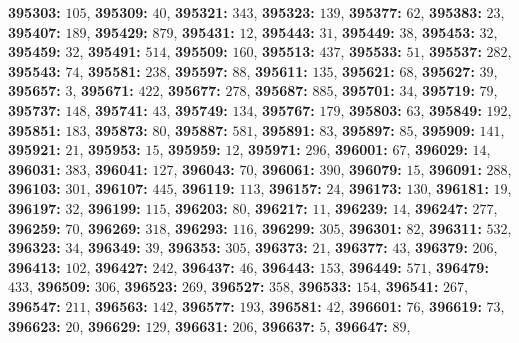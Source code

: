 \textsf{\bfseries 395303:} $105$, \textsf{\bfseries 395309:} $40$, \textsf{\bfseries 395321:} $343$, \textsf{\bfseries 395323:} $139$, \textsf{\bfseries 395377:} $62$, \textsf{\bfseries 395383:} $23$, \textsf{\bfseries 395407:} $189$, \textsf{\bfseries 395429:} $879$, \textsf{\bfseries 395431:} $12$, \textsf{\bfseries 395443:} $31$, \textsf{\bfseries 395449:} $38$, \textsf{\bfseries 395453:} $32$, \textsf{\bfseries 395459:} $32$, \textsf{\bfseries 395491:} $514$, \textsf{\bfseries 395509:} $160$, \textsf{\bfseries 395513:} $437$, \textsf{\bfseries 395533:} $51$, \textsf{\bfseries 395537:} $282$, \textsf{\bfseries 395543:} $74$, \textsf{\bfseries 395581:} $238$, \textsf{\bfseries 395597:} $88$, \textsf{\bfseries 395611:} $135$, \textsf{\bfseries 395621:} $68$, \textsf{\bfseries 395627:} $39$, \textsf{\bfseries 395657:} $3$, \textsf{\bfseries 395671:} $422$, \textsf{\bfseries 395677:} $278$, \textsf{\bfseries 395687:} $885$, \textsf{\bfseries 395701:} $34$, \textsf{\bfseries 395719:} $79$, \textsf{\bfseries 395737:} $148$, \textsf{\bfseries 395741:} $43$, \textsf{\bfseries 395749:} $134$, \textsf{\bfseries 395767:} $179$, \textsf{\bfseries 395803:} $63$, \textsf{\bfseries 395849:} $192$, \textsf{\bfseries 395851:} $183$, \textsf{\bfseries 395873:} $80$, \textsf{\bfseries 395887:} $581$, \textsf{\bfseries 395891:} $83$, \textsf{\bfseries 395897:} $85$, \textsf{\bfseries 395909:} $141$, \textsf{\bfseries 395921:} $21$, \textsf{\bfseries 395953:} $15$, \textsf{\bfseries 395959:} $12$, \textsf{\bfseries 395971:} $296$, \textsf{\bfseries 396001:} $67$, \textsf{\bfseries 396029:} $14$, \textsf{\bfseries 396031:} $383$, \textsf{\bfseries 396041:} $127$, \textsf{\bfseries 396043:} $70$, \textsf{\bfseries 396061:} $390$, \textsf{\bfseries 396079:} $15$, \textsf{\bfseries 396091:} $288$, \textsf{\bfseries 396103:} $301$, \textsf{\bfseries 396107:} $445$, \textsf{\bfseries 396119:} $113$, \textsf{\bfseries 396157:} $24$, \textsf{\bfseries 396173:} $130$, \textsf{\bfseries 396181:} $19$, \textsf{\bfseries 396197:} $32$, \textsf{\bfseries 396199:} $115$, \textsf{\bfseries 396203:} $80$, \textsf{\bfseries 396217:} $11$, \textsf{\bfseries 396239:} $14$, \textsf{\bfseries 396247:} $277$, \textsf{\bfseries 396259:} $70$, \textsf{\bfseries 396269:} $318$, \textsf{\bfseries 396293:} $116$, \textsf{\bfseries 396299:} $305$, \textsf{\bfseries 396301:} $82$, \textsf{\bfseries 396311:} $532$, \textsf{\bfseries 396323:} $34$, \textsf{\bfseries 396349:} $39$, \textsf{\bfseries 396353:} $305$, \textsf{\bfseries 396373:} $21$, \textsf{\bfseries 396377:} $43$, \textsf{\bfseries 396379:} $206$, \textsf{\bfseries 396413:} $102$, \textsf{\bfseries 396427:} $242$, \textsf{\bfseries 396437:} $46$, \textsf{\bfseries 396443:} $153$, \textsf{\bfseries 396449:} $571$, \textsf{\bfseries 396479:} $433$, \textsf{\bfseries 396509:} $306$, \textsf{\bfseries 396523:} $269$, \textsf{\bfseries 396527:} $358$, \textsf{\bfseries 396533:} $154$, \textsf{\bfseries 396541:} $267$, \textsf{\bfseries 396547:} $211$, \textsf{\bfseries 396563:} $142$, \textsf{\bfseries 396577:} $193$, \textsf{\bfseries 396581:} $42$, \textsf{\bfseries 396601:} $76$, \textsf{\bfseries 396619:} $73$, \textsf{\bfseries 396623:} $20$, \textsf{\bfseries 396629:} $129$, \textsf{\bfseries 396631:} $206$, \textsf{\bfseries 396637:} $5$, \textsf{\bfseries 396647:} $89$, 
